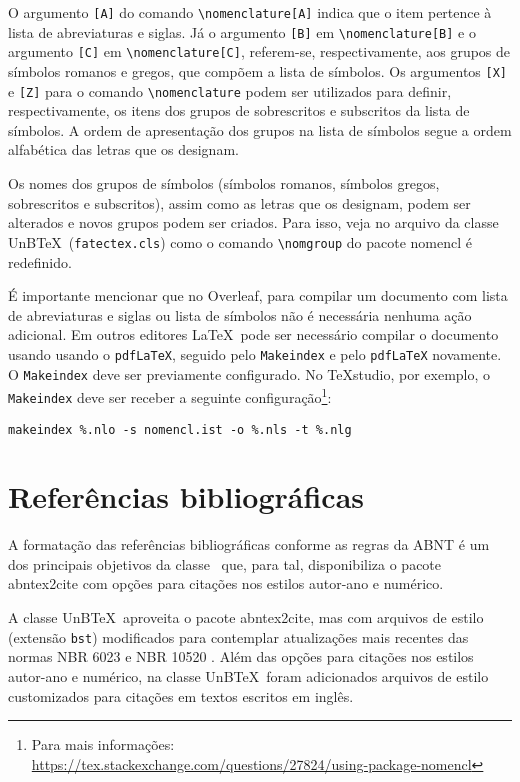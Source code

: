 O argumento \texttt{[A]} do comando \verb|\nomenclature[A]| indica que o item pertence à lista de abreviaturas e siglas. Já o argumento \texttt{[B]} em \verb|\nomenclature[B]| e o argumento \texttt{[C]} em \verb|\nomenclature[C]|, referem-se, respectivamente, aos grupos de símbolos romanos e gregos, que compõem a lista de símbolos. Os argumentos \texttt{[X]} e \texttt{[Z]} para o comando \verb|\nomenclature| podem ser utilizados para definir, respectivamente, os itens dos grupos de sobrescritos e subscritos da lista de símbolos. A ordem de apresentação dos grupos na lista de símbolos segue a ordem alfabética das letras que os designam.

Os nomes dos grupos de símbolos (símbolos romanos, símbolos gregos, sobrescritos e subscritos), assim como as letras que os designam, podem ser alterados e novos grupos podem ser criados. Para isso, veja no arquivo da classe UnB\TeX\ (\texttt{fatectex.cls}) como o comando \verb|\nomgroup| do pacote \textsf{nomencl} é redefinido.

É importante mencionar que no Overleaf, para compilar um documento com lista de abreviaturas e siglas ou lista de símbolos não é necessária nenhuma ação adicional. Em outros editores \LaTeX\ pode ser necessário compilar o documento usando usando o \texttt{pdfLaTeX}, seguido pelo \texttt{Makeindex} e pelo \texttt{pdfLaTeX} novamente. O \texttt{Makeindex} deve ser previamente configurado. No TeXstudio, por exemplo, o \texttt{Makeindex} deve ser receber a seguinte configuração\footnote{Para mais informações: \url{https://tex.stackexchange.com/questions/27824/using-package-nomencl}}:
\begin{verbatim}
makeindex %.nlo -s nomencl.ist -o %.nls -t %.nlg
\end{verbatim}

\section{Referências bibliográficas}\label{sec:referencias}

A formatação das referências bibliográficas conforme as regras da ABNT é um dos principais objetivos da classe \abnTeX\ que, para tal, disponibiliza o pacote \textsf{abntex2cite} com opções para citações nos estilos autor-ano e numérico.

A classe UnB\TeX\ aproveita o pacote \textsf{abntex2cite}, mas com arquivos de estilo (extensão \texttt{bst}) modificados para contemplar atualizações mais recentes das normas NBR 6023 \cite{NBR6023:2018} e NBR 10520 \cite{NBR10520:2023}. Além das opções para citações nos estilos autor-ano e numérico, na classe UnB\TeX\ foram adicionados arquivos de estilo customizados para citações em textos escritos em inglês.

